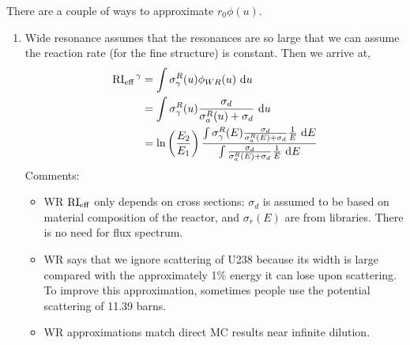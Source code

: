 \documentclass{school-22.211-notes}
\begin{document}
There are a couple of ways to approximate $r_0 \phi(u)$. 
\begin{enumerate}
\item Wide resonance assumes that the resonances are so large that we can assume the reaction rate (for the fine structure) is constant. 
Then we arrive at, 
\begin{align}
\left. \mathrm{RI}_{\mathrm{eff}} \right.^{\gamma} &= \int \sigma_{\gamma}^R (u) \phi_{WR} (u) \mbox{ }\mathrm{d} u \\
&= \int \sigma_{\gamma}^R (u) \frac{\sigma_d}{\sigma_a^R(u) + \sigma_d} \mbox{ }\mathrm{d} u \\
&= \ln\left( \frac{E_2}{E_1} \right) \frac{ \int \sigma_{\gamma}^R (E) \frac{\sigma_d}{\sigma_{a}^R(E) + \sigma_d} \frac{1}{E} \mbox{ }\mathrm{d} E}{ \int \frac{\sigma_d}{\sigma_{a}^R(E) + \sigma_d} \frac{1}{E} \mbox{ }\mathrm{d} E}
\end{align}
Comments:
\begin{itemize}
\item WR $\mathrm{RI}_{\mathrm{eff}}$ only depends on cross sections: $\sigma_d$ is assumed to be based on material composition of the reactor, and $\sigma_r(E)$ are from libraries. There is no need for flux spectrum. 

\item WR says that we ignore scattering of U238 because its width is large compared with the approximately 1\% energy it can lose upon scattering. To improve this approximation, sometimes people use the potential scattering of 11.39 barns. 

\item WR approximations match direct MC results near infinite dilution. 
\end{itemize}




\end{enumerate}
\end{document}
